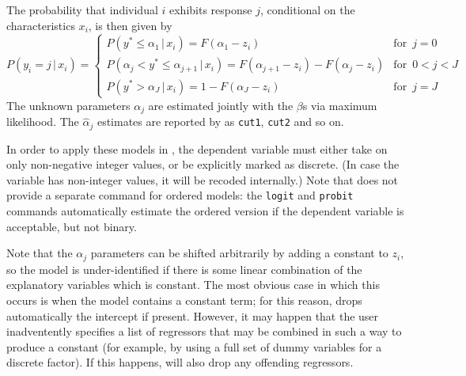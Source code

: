 The probability that individual $i$ exhibits response $j$, conditional
on the characteristics $x_i$, is then given by
%
\begin{equation}
  \label{eq:QR-ordered}
  P(y_i = j \,|\, x_i) = \left\{
    \begin{array}{ll}
      P(y^* \leq \alpha_1 \,|\, x_i) = F(\alpha_1 - z_i) & \textrm{for }\, j = 0 \\
      P(\alpha_j < y^* \leq \alpha_{j+1} \,|\, x_i) = 
      F(\alpha_{j+1} - z_i) -  F(\alpha_j - z_i) & \textrm{for }\, 0 < j < J \\
      P(y^* > \alpha_J \,|\, x_i) = 1 -  F(\alpha_J - z_i) & \textrm{for }\, j = J 
    \end{array}
    \right.
\end{equation}
%
The unknown parameters $\alpha_j$ are estimated jointly with the
$\beta$s via maximum likelihood.  The $\hat{\alpha}_j$ estimates are
reported by  as \texttt{cut1}, \texttt{cut2} and so on.

In order to apply these models in , the dependent variable
must either take on only non-negative integer values, or be explicitly
marked as discrete.  (In case the variable has non-integer values, it
will be recoded internally.)  Note that  does not provide a
separate command for ordered models: the \texttt{logit} and
\texttt{probit} commands automatically estimate the ordered version if
the dependent variable is acceptable, but not binary.

Note that the $\alpha_j$ parameters can be shifted arbitrarily by
adding a constant to $z_i$, so the model is under-identified if there
is some linear combination of the explanatory variables which is
constant. The most obvious case in which this occurs is when the model
contains a constant term; for this reason,  drops
automatically the intercept if present. However, it may happen that
the user inadventently specifies a list of regressors that may be
combined in such a way to produce a constant (for example, by using a
full set of dummy variables for a discrete factor). If this happens,
 will also drop any offending regressors.

